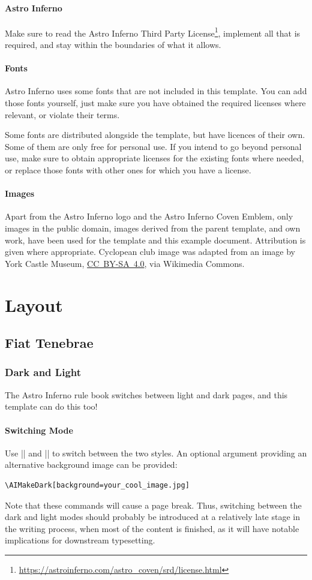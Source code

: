 \documentclass[letterpaper,twocolumn,openany,nodeprecatedcode]{astroinfernobook}
\begin{document}
\subsection{Astro Inferno}
Make sure to read the Astro Inferno Third Party
License\footnote{\url{https://astroinferno.com/astro_coven/srd/license.html}},
implement all that is required, and stay within the boundaries of what
it allows.

\subsection{Fonts}
Astro Inferno uses some fonts that are not included in this
template. You can add those fonts yourself, just make sure you have
obtained the required licenses where relevant, or violate their terms.

Some fonts are distributed alongside the template, but have licences of their own.
Some of them are only free for personal use. If
you intend to go beyond personal use, make sure to obtain
appropriate licenses for the existing fonts where needed, or replace those
fonts with other ones for which you have a license.

\subsection{Images}
Apart from the Astro Inferno logo and the Astro Inferno Coven Emblem, only images in the public domain, images derived from the parent template, and own work, have been used for the template and this example document. Attribution is given where appropriate.
Cyclopean club image was adapted from an image by York Castle Museum,
\href{https://creativecommons.org/licenses/by-sa/4.0}{CC~BY-SA~4.0},
via Wikimedia Commons.


\part{Layout}
\chapter{Fiat Tenebrae}
\section{Dark and Light}
The Astro Inferno rule book switches between light and dark pages, and
this template can do this too!
\subsection{Switching Mode}
Use |\AIMakeDark| and |\AIMakeLight| to
switch between the two styles. An optional argument providing an
alternative background image can be provided:
\begin{lstlisting}
\AIMakeDark[background=your_cool_image.jpg]
\end{lstlisting}
Note that these commands will cause a page break. Thus, switching between the dark and
light modes should probably be introduced at a relatively late stage
in the writing process, when most of the content is finished,
as it will have notable implications for downstream typesetting.
\end{document}

